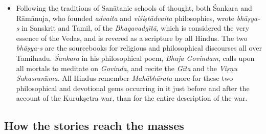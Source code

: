 \begin{itemize}
\item Following the traditions of Sanātanic schools of thought, both Śankara and Rāmānuja, who founded \textit{advaita} and \textit{viśi}ṣ\textit{tādvaita} philosophies, wrote \textit{bhāṣya-s} in Sanskrit and Tamil, of the \textit{Bhagavadgītā}, which is considered the very essence of the Vedas, and is revered as a scripture by all Hindus. The two \textit{bhāṣya-s} are the sourcebooks for religious and philosophical discourses all over Tamilnadu. \textit{Śankara} in his philosophical poem, \textit{Bhaja Govindam}, calls upon all mortals to meditate on \textit{Govinda}, and recite the \textit{Gīta} and the \textit{Viṣṇu Sahasran}ā\textit{ma}. All Hindus remember \textit{Mahābhārata} more for these two philosophical and devotional gems occurring in it just before and after the account of the Kurukṣetra war, than for the entire description of the war.

\end{itemize}


\subsection*{How the stories reach the masses}

